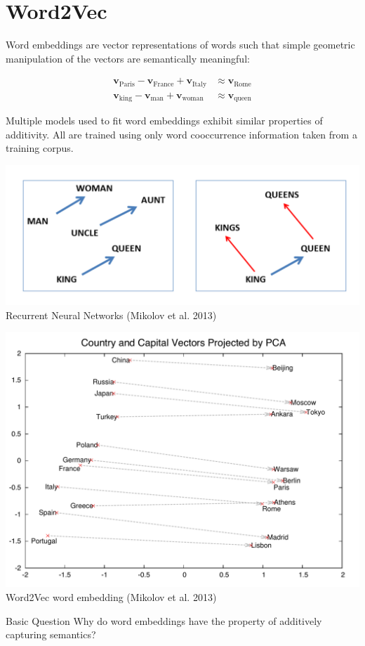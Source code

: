 \documentclass[xcolor=x11names,compress,ignorenonframetext,10pt]{beamer}
\renewcommand{\(}{\begin{columns}}
\renewcommand{\)}{\end{columns}}
\newcommand{\<}[1]{\begin{column}{#1}}
\renewcommand{\>}{\end{column}}
\def\refcolor{DodgerBlue4}
\newcommand{\refer}[1]{({\color{\refcolor}#1})}
\begin{document}
\section{Word2Vec}

\begin{frame}
Word embeddings are vector representations of words such that simple geometric manipulation of the vectors are semantically meaningful:

\begin{align*}
\mathbf{v}_{\textrm{Paris}} - \mathbf{v}_{\textrm{France}} + \mathbf{v}_{\textrm{Italy}} & \approx \mathbf{v}_{\textrm{Rome}} \\
\mathbf{v}_{\textrm{king}} - \mathbf{v}_{\textrm{man}} + \mathbf{v}_{\textrm{woman}} & \approx \mathbf{v}_{\textrm{queen}}
\end{align*}

Multiple models used to fit word embeddings exhibit similar properties of additivity. All are trained using only
word cooccurrence information taken from a training corpus.

\begin{center}
\includegraphics[width=.5\textwidth]{figures/word2vec/plurality}
\\
Recurrent Neural Networks \refer{Mikolov et al. 2013}
\end{center}

\end{frame}

\begin{frame}
\begin{center}
\includegraphics[width=.7\textwidth]{figures/word2vec/capitals}
\\
Word2Vec word embedding \refer{Mikolov et al. 2013}
\end{center}

\begin{block}{Basic Question}
Why do word embeddings have the property of additively capturing semantics? 
\end{block}

\end{frame}
\end{document}
